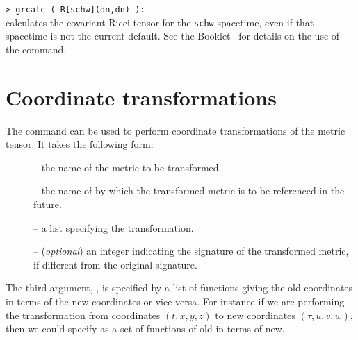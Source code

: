 \documentclass{article}
\begin{document}
\noindent\texttt{> grcalc ( R[schw](dn,dn) ):}\\

\noindent calculates the covariant Ricci tensor for the \texttt{schw}
spacetime, even if that spacetime is not the current default. See the
Booklet \grCalcRef~for details on the use of the 
command.
%
\section{Coordinate transformations} \label{sec:grtransform}
%
The command  can be used to perform coordinate
transformations of the metric tensor. It takes the following form:\\
%
\begin{cmdspec}
  \label{spec:grtransform}

  \begin{description}
    \item[] -- the name of the metric to be transformed.  
    \item[] -- the name of by which the transformed metric
      is to be referenced in the future.
    \item[] -- a list specifying the transformation.
    \item[] -- (\textit{optional}) an integer indicating
      the signature of the transformed metric, if different from the
      original signature.
  \end{description}

\end{cmdspec}

The third argument, , is specified by a list of functions giving
the old coordinates in terms of the new coordinates or vice versa. For
instance if we are performing the transformation from coordinates
$(t,x,y,z)$ to new coordinates $(\tau,u,v,w)$, 
then we could specify  as a set of functions of old in terms
of new,\\
\end{document}
